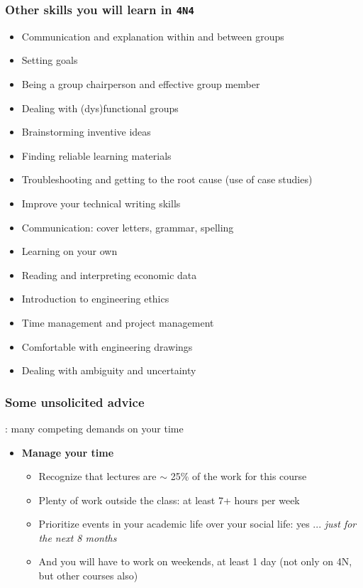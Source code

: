 \begin{frame}\frametitle{Other skills you will learn in \texttt{4N4}}
	\begin{itemize}
		\item	Communication and explanation within and between groups
		\item	Setting goals		
		\item	Being a group chairperson and effective group member
		\item	Dealing with (dys)functional groups
		\item	Brainstorming inventive ideas
		\item	Finding reliable learning materials
		\item	Troubleshooting and getting to the root cause {\scriptsize (use of case studies)}
		\item	Improve your technical writing skills
		\item	Communication: cover letters, grammar, spelling
		\item	Learning on your own
		\item	Reading and interpreting economic data
		\item	Introduction to engineering ethics
		\item	Time management and project management
		\item	Comfortable with engineering drawings
		\item	Dealing with ambiguity and uncertainty
	\end{itemize}
\end{frame}

\begin{frame}\frametitle{Some unsolicited advice}
	\begin{exampleblock}{}
		{} : many competing demands on your time
	\end{exampleblock}
	\begin{itemize}
		\item	\textbf{Manage your time}
		\begin{itemize}
			\item	Recognize that lectures are $\sim$ 25\% of the work for this course
			\item	Plenty of work outside the class: at least 7+ hours per week
			\item	Prioritize events in your academic life over your social life: yes ... \emph{just for the next 8 months}
			\item	And you will have to work on weekends, at least 1 day (not only on 4N, but other courses also)
		\end{itemize}
	\end{itemize}
\end{frame}

